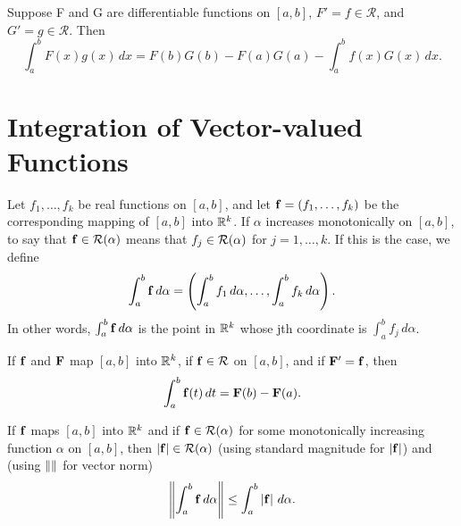 

\begin{theorem} %
  \label{thm:chap6:integration_by_parts}
  Suppose F and G are differentiable functions on $[a, b]$, $F' = f
  \in \mathcal{R}$, and $G' = g \in \mathcal{R}$. Then
  \[ \int_a^b F(x) g(x) \, dx = F(b)G(b) - F(a)G(a) - \int_a^b f(x)
  G(x) \, dx. \]
\end{theorem}

\section{Integration of Vector-valued Functions}
\label{sec:chap6:integration_vector_valued}

\begin{definition} %
  \label{def:chap6:integral_vector_valued}
  Let $f_1, \dots, f_k$ be real functions on $[a, b]$, and let
  $\mathbf{f} = (f_1, \dots, f_k)$ be the corresponding mapping of $[a,
  b]$ into $\mathbb{R}^k$. If $\alpha$ increases monotonically on $[a, b]$,
  to say that $\mathbf{f} \in \mathcal{R}(\alpha)$ means that $f_j
  \in \mathcal{R}(\alpha)$ for $j=1, \dots, k$. If this is the case, we define
  \[ \int_a^b \mathbf{f} \, d\alpha = \left( \int_a^b f_1 \, d\alpha,
  \dots, \int_a^b f_k \, d\alpha \right). \]
  In other words, $\int_a^b \mathbf{f} \, d\alpha$ is the point in
  $\mathbb{R}^k$ whose jth coordinate is $\int_a^b f_j \, d\alpha$.
\end{definition}


\begin{theorem} %
  \label{thm:chap6:ftc_vector}
  If $\mathbf{f}$ and $\mathbf{F}$ map $[a, b]$ into $\mathbb{R}^k$, if $\mathbf{f}
  \in \mathcal{R}$ on $[a, b]$, and if $\mathbf{F}' = \mathbf{f}$, then
  \[ \int_a^b \mathbf{f}(t) \, dt = \mathbf{F}(b) - \mathbf{F}(a). \]
\end{theorem}

\begin{theorem} %
  \label{thm:chap6:vector_integral_inequality}
  If $\mathbf{f}$ maps $[a, b]$ into $\mathbb{R}^k$ and if $\mathbf{f} \in
  \mathcal{R}(\alpha)$ for some monotonically increasing function
  $\alpha$ on $[a, b]$, then $\left\lvert \mathbf{f} \right\rvert \in
  \mathcal{R}(\alpha)$ (using standard magnitude for
  $\left\lvert \mathbf{f} \right\rvert$) and (using $\left\lVert  \right\rVert$ for vector norm)
  \[ \left\lVert \int_a^b \mathbf{f} \, d\alpha \right\rVert \le \int_a^b \left\lvert \mathbf{f} \right\rvert
  \, d\alpha. \]
\end{theorem}

